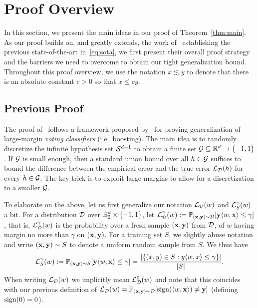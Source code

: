 \section{Proof Overview}
\label{sec:overview}
In this section, we present the main ideas in our proof of Theorem~\ref{thm:main}. As our proof builds on, and greatly extends, the work of~\cite{SVMbest} establishing the previous state-of-the-art in~\eqref{eq:sota}, we first present their overall proof strategy and the barriers we need to overcome to obtain our tight generalization bound. Throughout this proof overview, we use the notation $x \lesssim y$ to denote that there is an absolute constant $c>0$ so that $x \leq cy$.

\subsection{Previous Proof}
The proof of~\cite{SVMbest} follows a framework proposed by~\cite{SFBL98} for proving generalization of large-margin \emph{voting classifiers} (i.e.\ boosting). The main idea is to randomly discretize the infinite hypothesis set $\mathcal{S}^{d-1}$ to obtain a finite set $\mathcal{G} \subseteq \mathbb{R}^d \to \{-1,1\}$. If $\mathcal{G}$ is small enough, then a standard union bound over all $h \in \mathcal{G}$ suffices to bound the difference between the empirical error and the true error $\mathcal{L}_{\mathcal{D}}(h)$ for every $h \in \mathcal{G}$. The key trick is to exploit large margins to allow for a discretization to a smaller $\mathcal{G}$.

To elaborate on the above, let us first generalize our notation $\mathcal{L}_{\mathcal{D}}(w)$ and $\mathcal{L}^\gamma_S(w)$ a bit. For a distribution $\mathcal{D}$ over $\mathbb{B}_2^d \times \{-1,1\}$, let
$
\mathcal{L}^\gamma_{\mathcal{D}}(w) := \mathbb{P}_{(\mathbf{x},\mathbf{y}) \sim \mathcal{D}}[\mathbf{y}\langle w , \mathbf{x} \rangle \leq \gamma]
$,
that is, $\mathcal{L}^\gamma_{\mathcal{D}}(w)$ is the probability over a fresh sample $(\mathbf{x}, \mathbf{y})$ from $\mathcal{D}$, of $w$ having margin no more than $\gamma$ on $(\mathbf{x},\mathbf{y})$. For a training set $S$, we slightly abuse notation and write $(\mathbf{x},\mathbf{y}) \sim S$ to denote a uniform random sample from $S$. We thus have
\[
\mathcal{L}^\gamma_S(w) := \mathbb{P}_{(\mathbf{x},\mathbf{y}) \sim S}[\mathbf{y}\langle w , \mathbf{x} \rangle \leq \gamma] = \frac{|\{(x,y) \in S : y\langle w , x \rangle \leq \gamma\}|}{|S|}.
\]
When writing $\mathcal{L}_{\mathcal{D}}(w)$ we implicitly mean $\mathcal{L}_{\mathcal{D}}^0(w)$ and note that this coincides with our previous definition of $\mathcal{L}_{\mathcal{D}}(w) = \mathbb{P}_{(\mathbf{x} ,\mathbf{y})\sim \mathcal{D}}[\operatorname{sign}(\langle w, \mathbf{x} \rangle) \neq \mathbf{y}]$ (defining $\operatorname{sign}(0)=0$).

